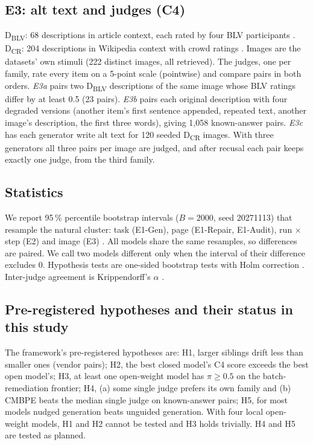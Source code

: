 \documentclass[conference]{IEEEtran}
\begin{document}
\subsection{E3: alt text and judges (C4)}
D\textsubscript{BLV}: 68 descriptions in article context, each rated by four BLV participants
\cite{kreiss2022context}. D\textsubscript{CR}: 204 descriptions in Wikipedia context with crowd
ratings \cite{kreiss2024contextref}. Images are the datasets' own stimuli (222 distinct images,
all retrieved). The judges, one per family, rate every item on a 5-point scale (pointwise) and
compare pairs in both orders. \emph{E3a} pairs two D\textsubscript{BLV} descriptions of the same
image whose BLV ratings differ by at least 0.5 (23 pairs). \emph{E3b} pairs each original
description with four degraded versions (another item's first sentence appended, repeated text,
another image's description, the first three words), giving 1{,}058 known-answer pairs.
\emph{E3c} has each generator write alt text for 120 seeded D\textsubscript{CR} images. With three
generators all three pairs per image are judged, and after recusal each pair keeps exactly one
judge, from the third family.

\subsection{Statistics}
We report 95\,\% percentile bootstrap intervals ($B=2000$, seed 20271113) that resample the
natural cluster: task (E1-Gen), page (E1-Repair, E1-Audit), run $\times$ step (E2) and image
(E3) \cite{efron1993bootstrap}. All models share the same resamples, so differences are paired.
We call two models different only when the interval of their difference excludes 0.
Hypothesis tests are one-sided bootstrap tests with Holm correction \cite{holm1979simple}.
Inter-judge agreement is Krippendorff's $\alpha$ \cite{krippendorff2004content}.

\subsection{Pre-registered hypotheses and their status in this study}
The framework's pre-registered hypotheses are: H1, larger siblings drift less than smaller ones
(vendor pairs); H2, the best closed model's C4 score exceeds the best open model's; H3, at
least one open-weight model has $\pi\geq 0.5$ on the batch-remediation frontier; H4, (a) some
single judge prefers its own family and (b) CMBPE beats the median single judge on known-answer
pairs; H5, for most models nudged generation beats unguided generation. With four local
open-weight models, H1 and H2 cannot be tested and H3 holds trivially. H4 and H5 are tested as
planned.
\end{document}
